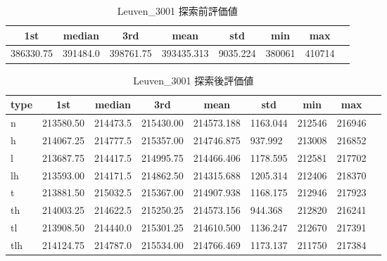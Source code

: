 \begin{table}[htbp]
    \caption{Leuven\_3001 探索前評価値}
    \begin{tabular}{|l|l|l|l|l|l|l|l|}\hline
    \multicolumn{1}{|c|}{\textbf{1st}}
    &\multicolumn{1}{c|}{\textbf{median}}
    &\multicolumn{1}{c|}{\textbf{3rd}}
    &\multicolumn{1}{c|}{\textbf{mean}}
    &\multicolumn{1}{c|}{\textbf{std}}
    &\multicolumn{1}{c|}{\textbf{min}}
    &\multicolumn{1}{c|}{\textbf{max}}\\\hline
	386330.75 & 391484.0 & 398761.75 & 393435.313 & 9035.224 & 380061 & 410714\\\hline
	\end{tabular}
\end{table}
\begin{table}[htbp]
    \caption{Leuven\_3001 探索後評価値}
    \begin{tabular}{|l|l|l|l|l|l|l|l|l|}\hline
    \multicolumn{1}{|c|}{\textbf{type}}
    &\multicolumn{1}{|c|}{\textbf{1st}}
    &\multicolumn{1}{c|}{\textbf{median}}
    &\multicolumn{1}{c|}{\textbf{3rd}}
    &\multicolumn{1}{c|}{\textbf{mean}}
    &\multicolumn{1}{c|}{\textbf{std}}
    &\multicolumn{1}{c|}{\textbf{min}}
    &\multicolumn{1}{c|}{\textbf{max}}\\\hline
	n & 213580.50 & 214473.5 & 215430.00 & 214573.188 & 1163.044 & 212546 & 216946\\\hline
	h & 214067.25 & 214777.5 & 215357.00 & 214746.875 & 937.992 & 213008 & 216852\\\hline
	l & 213687.75 & 214417.5 & 214995.75 & 214466.406 & 1178.595 & 212581 & 217702\\\hline
	lh & 213593.00 & 214171.5 & 214862.50 & 214315.688 & 1205.314 & 212406 & 218370\\\hline
	t & 213881.50 & 215032.5 & 215367.00 & 214907.938 & 1168.175 & 212946 & 217923\\\hline
	th & 214003.25 & 214622.5 & 215250.25 & 214573.156 & 944.368 & 212820 & 216241\\\hline
	tl & 213908.50 & 214440.0 & 215301.25 & 214610.500 & 1136.247 & 212670 & 217391\\\hline
	tlh & 214124.75 & 214787.0 & 215534.00 & 214766.469 & 1173.137 & 211750 & 217384\\\hline
	\end{tabular}
\end{table}
